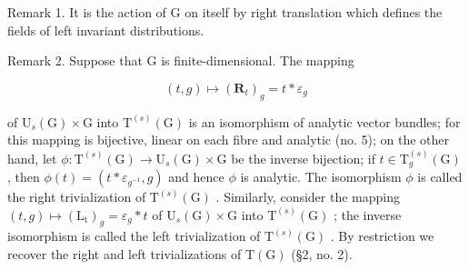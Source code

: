 Remark 1. It is the action of G on itself by right translation which defines the fields of left invariant distributions.

Remark 2. Suppose that G is finite-dimensional. The mapping

\[
(t, g) \mapsto (\mathbf {R} _ {t}) _ {g} = t * \varepsilon_ {g}
\]

of \(\mathrm{U}_{s}(\mathrm{G})\times\mathrm{G}\) into \(\mathrm{T}^{(s)}(\mathrm{G})\) is an isomorphism of analytic vector bundles; for this mapping is bijective, linear on each fibre and analytic (no. 5); on the other hand, let \(\phi:\mathrm{T}^{(s)}(\mathrm{G})\to\mathrm{U}_{s}(\mathrm{G})\times\mathrm{G}\) be the inverse bijection; if \(t\in\mathrm{T}_{g}^{(s)}(\mathrm{G})\) , then \(\phi(t)=(t*\varepsilon_{g^{-1}},g)\) and hence \(\phi\) is analytic. The isomorphism \(\phi\) is called the right trivialization of \(\mathrm{T}^{(s)}(\mathrm{G})\) . Similarly, consider the mapping \((t,g)\mapsto(\mathrm{L}_{\mathrm{t}})_{g}=\varepsilon_{g}*t\) of \(\mathrm{U}_{s}(\mathrm{G})\times\mathrm{G}\) into \(\mathrm{T}^{(s)}(\mathrm{G})\) ; the inverse isomorphism is called the left trivialization of \(\mathrm{T}^{(s)}(\mathrm{G})\) . By restriction we recover the right and left trivializations of \(\mathrm{T}(\mathrm{G})\) (§2, no. 2).

